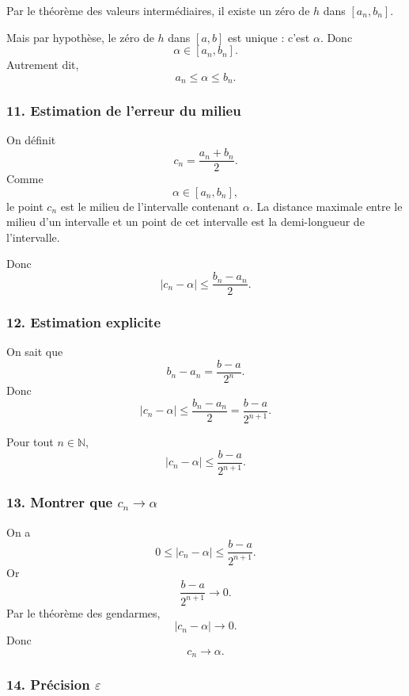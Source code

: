 \documentclass[11pt,a4paper]{article}
\newcommand{\N}{\mathbb{N}}
\begin{document}
Par le théorème des valeurs intermédiaires, il existe un zéro de \(h\) dans \([a_n,b_n]\).

Mais par hypothèse, le zéro de \(h\) dans \([a,b]\) est unique : c'est \(\alpha\). Donc
\[
\alpha\in[a_n,b_n].
\]
Autrement dit,
\[
a_n\leq\alpha\leq b_n.
\]


\subsubsection*{11. Estimation de l'erreur du milieu}

On définit
\[
c_n=\frac{a_n+b_n}{2}.
\]
Comme
\[
\alpha\in[a_n,b_n],
\]
le point \(c_n\) est le milieu de l'intervalle contenant \(\alpha\). La distance maximale entre le milieu d'un intervalle et un point de cet intervalle est la demi-longueur de l'intervalle.

Donc
\[
|c_n-\alpha|\leq \frac{b_n-a_n}{2}.
\]


\subsubsection*{12. Estimation explicite}

On sait que
\[
b_n-a_n=\frac{b-a}{2^n}.
\]
Donc
\[
|c_n-\alpha|\leq \frac{b_n-a_n}{2}
=
\frac{b-a}{2^{n+1}}.
\]

\begin{resultatbox}
Pour tout \(n\in\N\),
\[
|c_n-\alpha|\leq \frac{b-a}{2^{n+1}}.
\]
\end{resultatbox}


\subsubsection*{13. Montrer que \(c_n\to\alpha\)}

On a
\[
0\leq |c_n-\alpha|\leq \frac{b-a}{2^{n+1}}.
\]
Or
\[
\frac{b-a}{2^{n+1}}\to0.
\]
Par le théorème des gendarmes,
\[
|c_n-\alpha|\to0.
\]
Donc
\[
c_n\to\alpha.
\]


\subsubsection*{14. Précision \(\varepsilon\)}
\end{document}
